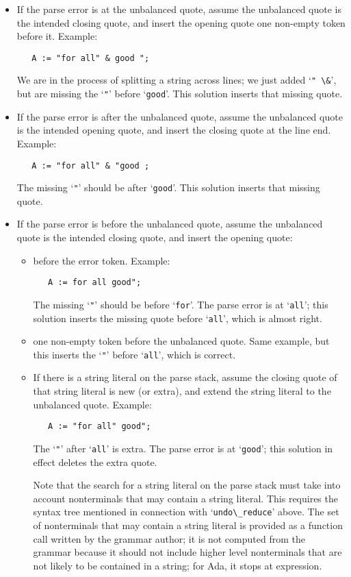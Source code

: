 \documentclass{article}
\newcommand{\code}[1]{`\lstinline|#1|'}
\begin{document}
\begin{itemize}
\item If the parse error is at the unbalanced quote, assume the unbalanced
quote is the intended closing quote, and insert the opening quote one
non-empty token before it. Example:
\begin{lstlisting}
   A := "for all" & good ";
\end{lstlisting}
We are in the process of splitting a string across lines; we just
added \code{" \&}, but are missing the \code{"} before \code{good}.
This solution inserts that missing quote.

\item If the parse error is after the unbalanced quote, assume the unbalanced
quote is the intended opening quote, and insert the closing quote at
the line end. Example:
\begin{lstlisting}
   A := "for all" & "good ;
\end{lstlisting}
The missing \code{"} should be after \code{good}.
This solution inserts that missing quote.

\item If the parse error is before the unbalanced quote, assume the unbalanced
quote is the intended closing quote, and insert the opening quote:

\begin{itemize}
\item before the error token. Example:
\begin{lstlisting}
   A := for all good";
\end{lstlisting}
The missing \code{"} should be before \code{for}. The parse error is at \code{all};
this solution inserts the missing quote before \code{all}, which is
almost right.

\item one non-empty token before the unbalanced quote. Same example,
  but this inserts the \code{"} before \code{all}, which is correct.

\item If there is a string literal on the parse stack,
assume the closing quote of that string literal is new (or extra),
and extend the string literal to the unbalanced quote. Example:
\begin{lstlisting}
   A := "for all" good";
\end{lstlisting}
The \code{"} after \code{all} is extra. The parse error is at \code{good};
this solution in effect deletes the extra quote.

Note that the search for a string literal on the parse stack must take
into account nonterminals that may contain a string literal. This
requires the syntax tree mentioned in connection with
\code{undo\_reduce} above. The set of nonterminals that may contain a
string literal is provided as a function call written by the grammar
author; it is not computed from the grammar because it should not
include higher level nonterminals that are not likely to be contained
in a string; for Ada, it stops at expression.
\end{itemize}
\end{itemize}
\end{document}
